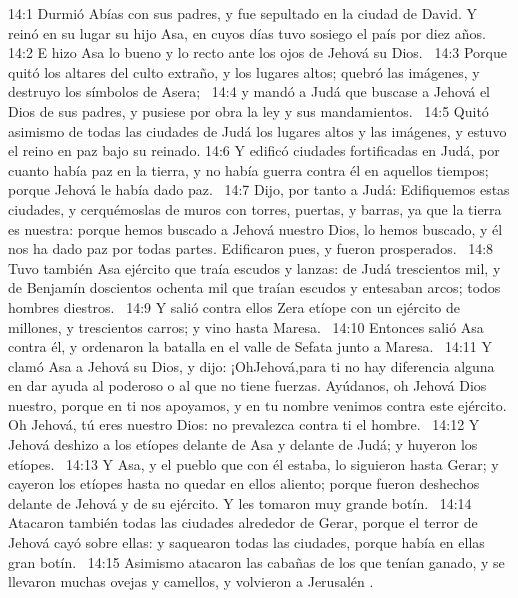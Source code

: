 														
														14:1 Durmió Abías con sus padres, y fue sepultado en la ciudad de David. Y reinó en su lugar su hijo Asa, en cuyos días tuvo sosiego el país por diez años.  
														14:2 E hizo Asa lo bueno y lo recto ante los ojos de Jehová su Dios.  
														14:3 Porque quitó los altares del culto extraño, y los lugares altos; quebró las imágenes, y destruyo los símbolos de Asera;  
														14:4 y mandó a Judá que buscase a Jehová el Dios de sus padres, y pusiese por obra la ley y sus mandamientos.  
														14:5 Quitó asimismo de todas las ciudades de Judá los lugares altos y las imágenes, y estuvo el reino en paz bajo su reinado. 
														14:6 Y edificó ciudades fortificadas en Judá, por cuanto había paz en la tierra, y no había guerra contra él en aquellos tiempos; porque Jehová le había dado paz.  
														14:7 Dijo, por tanto a Judá: Edifiquemos estas ciudades, y cerquémoslas de muros con torres, puertas, y barras, ya que la tierra es nuestra: porque hemos buscado a Jehová nuestro Dios, lo hemos buscado, y él nos ha dado paz por todas partes. Edificaron pues, y fueron prosperados.  
														14:8 Tuvo también Asa ejército que traía escudos y lanzas: de Judá trescientos mil, y de Benjamín doscientos ochenta mil que traían escudos y entesaban arcos; todos hombres diestros.  
														14:9 Y salió contra ellos Zera etíope con un ejército de millones, y trescientos carros; y vino hasta Maresa.  
														14:10 Entonces salió Asa contra él, y ordenaron la batalla en el valle de Sefata junto a Maresa.  
														14:11 Y clamó Asa a Jehová su Dios, y dijo: ¡OhJehová,para ti no hay diferencia alguna en dar ayuda al poderoso o al que no tiene fuerzas. Ayúdanos, oh Jehová Dios nuestro, porque en ti nos apoyamos, y en tu nombre venimos contra este ejército. Oh Jehová, tú eres nuestro Dios: no prevalezca contra ti el hombre.  
														14:12 Y Jehová deshizo a los etíopes delante de Asa y delante de Judá; y huyeron los etíopes.  
														14:13 Y Asa, y el pueblo que con él estaba, lo siguieron hasta Gerar; y cayeron los etíopes hasta no quedar en ellos aliento; porque fueron deshechos delante de Jehová y de su ejército. Y les tomaron muy grande botín.  
														14:14 Atacaron también todas las ciudades alrededor de Gerar, porque el terror de Jehová cayó sobre ellas: y saquearon todas las ciudades, porque había en ellas gran botín.  
														14:15 Asimismo atacaron las cabañas de los que tenían ganado, y se llevaron muchas ovejas y camellos, y volvieron a Jerusalén .  
